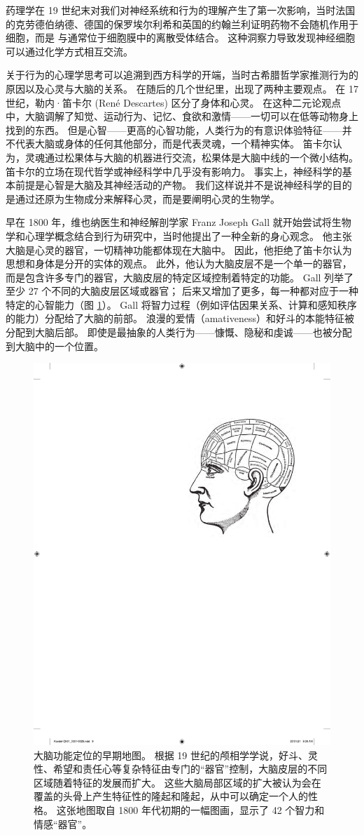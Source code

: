 药理学在 19 世纪末对我们对神经系统和行为的理解产生了第一次影响，当时法国的克劳德伯纳德、德国的保罗埃尔利希和英国的约翰兰利证明药物不会随机作用于细胞，而是 与通常位于细胞膜中的离散受体结合。 
这种洞察力导致发现神经细胞可以通过化学方式相互交流。


关于行为的心理学思考可以追溯到西方科学的开端，当时古希腊哲学家推测行为的原因以及心灵与大脑的关系。
在随后的几个世纪里，出现了两种主要观点。 
在 17 世纪，勒内·笛卡尔 (René Descartes) 区分了身体和心灵。 
在这种二元论观点中，大脑调解了知觉、运动行为、记忆、食欲和激情——一切可以在低等动物身上找到的东西。
但是心智——更高的心智功能，人类行为的有意识体验特征——并不代表大脑或身体的任何其他部分，而是代表灵魂，一个精神实体。 
笛卡尔认为，灵魂通过松果体与大脑的机器进行交流，松果体是大脑中线的一个微小结构。 
笛卡尔的立场在现代哲学或神经科学中几乎没有影响力。 事实上，神经科学的基本前提是心智是大脑及其神经活动的产物。 
我们这样说并不是说神经科学的目的是通过还原为生物成分来解释心灵，而是要阐明心灵的生物学。


早在 1800 年，维也纳医生和神经解剖学家 Franz Joseph Gall 就开始尝试将生物学和心理学概念结合到行为研究中，当时他提出了一种全新的身心观念。 
他主张大脑是心灵的器官，一切精神功能都体现在大脑中。 
因此，他拒绝了笛卡尔认为思想和身体是分开的实体的观点。 
此外，他认为大脑皮层不是一个单一的器官，而是包含许多专门的器官，大脑皮层的特定区域控制着特定的功能。 
Gall 列举了至少 27 个不同的大脑皮层区域或器官； 后来又增加了更多，每一种都对应于一种特定的心智能力（图 \ref{fig:1_1}）。 
Gall 将智力过程（例如评估因果关系、计算和感知秩序的能力）分配给了大脑的前部。 
浪漫的爱情（amativeness）和好斗的本能特征被分配到大脑后部。 
即使是最抽象的人类行为——慷慨、隐秘和虔诚——也被分配到大脑中的一个位置。

\begin{figure}[htbp]
	\centering
	\includegraphics[width=0.5\linewidth]{chap01/fig_1_1}
	\caption{大脑功能定位的早期地图。 
		根据 19 世纪的颅相学学说，好斗、灵性、希望和责任心等复杂特征由专门的“器官”控制，大脑皮层的不同区域随着特征的发展而扩大。 
		这些大脑局部区域的扩大被认为会在覆盖的头骨上产生特征性的隆起和隆起，从中可以确定一个人的性格。 
		这张地图取自 1800 年代初期的一幅图画，显示了 42 个智力和情感“器官”。}
	\label{fig:1_1}
\end{figure}


